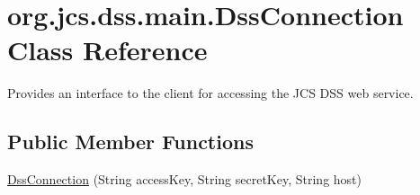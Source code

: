\hypertarget{classorg_1_1jcs_1_1dss_1_1main_1_1DssConnection}{}\section{org.\+jcs.\+dss.\+main.\+Dss\+Connection Class Reference}
\label{classorg_1_1jcs_1_1dss_1_1main_1_1DssConnection}


Provides an interface to the client for accessing the J\+CS D\+SS web service.  


\subsection*{Public Member Functions}
\begin{DoxyCompactItemize}
\item 
\hyperlink{classorg_1_1jcs_1_1dss_1_1main_1_1DssConnection_af240fbb96df0fbcfb47005e662dd4934}{Dss\+Connection} (String access\+Key, String secret\+Key, String host)\hypertarget{classorg_1_1jcs_1_1dss_1_1main_1_1DssConnection_af240fbb96df0fbcfb47005e662dd4934}{}\label{classorg_1_1jcs_1_1dss_1_1main_1_1DssConnection_af240fbb96df0fbcfb47005e662dd4934}


\end{DoxyCompactItemize}

